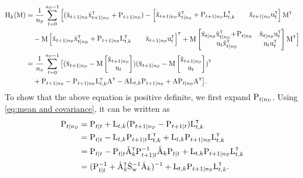 \begin{align}
    \mxH_k(\mxM) &= 
        \frac{1}{\nD} \sum_{t=0}^{\nD-1}  \Big[(\hat{\vcx}_{t+1|\nD}\hat{\vcx}_{t+1|\nD}^\tr + \mxP_{t+1|\nD}) -  \begin{bmatrix}\hat{\vcx}_{t+1|{\nD}}\hat{\vcx}_{t|{\nD}}^\tr + \mxP_{t+1|{\nD}}\mxL_{t,k}^\tr &\quad \hat{\vcx}_{t+1|\nD} \vcu_t^\tr  \end{bmatrix} {\mxM}^\tr  \nonumber \\
        &\quad -  {\mxM}\begin{bmatrix}\hat{\vcx}_{t+1|\nD}\hat{\vcx}_{t|\nD}^\tr + \mxP_{t+1|\nD}\mxL_{t,k}^\tr &\quad \hat{\vcx}_{t+1|\nD} \vcu_t^\tr  \end{bmatrix}^\tr + {\mxM} \begin{bmatrix}\hat{\vcx}_{t|\nD}\hat{\vcx}_{t|\nD}^\tr \!+\! \mxP_{t|\nD} & \hat{\vcx}_{t|\nD}\vcu_t^\tr\\ \vcu_t\hat{\vcx}_{t|\nD}^\tr &\vcu_t \vcu_t^\tr\end{bmatrix} {\mxM}^\tr \Big] \\
        &= \frac{1}{\nD} \sum_{t=0}^{\nD-1} 
        \big[ (\hat{\vcx}_{t+1|\nD} - 
        {\mxM}
        \begin{bmatrix}
            \hat{\vcx}_{t+1|\nD} \\ \vcu_t
        \end{bmatrix}
        )
        (\hat{\vcx}_{t+1|\nD} - 
        {\mxM}
        \begin{bmatrix}
            \hat{\vcx}_{t+1|\nD} \\ \vcu_t
        \end{bmatrix}
        )^\tr
        \nonumber \\
        &\quad + \mxP_{t+1|\nD} -  \mxP_{t+1|\nD}\mxL_{t,k}^\tr {\mxA}^\tr - {\mxA} \mxL_{t,k} \mxP_{t+1|\nD} + {\mxA}\mxP_{t|\nD}{\mxA}^\tr\big]. \label{eq:H_k 2}
\end{align}
To show that the above equation is positive definite, we first expand $\mxP_{t|\nD}$. Using \eqref{eq:mean and covariance}, it can be written as 
\begin{align}
    \mxP_{t|\nD} 
    &= \mxP_{t|t} + \mxL_{t,k}(\mxP_{t+1|\nD} - \mxP_{t+1|t})\mxL_{t,k}^\tr\\
    &= \mxP_{t|t} - \mxL_{t,k}\mxP_{t+1|t}\mxL_{t,k}^\tr + \mxL_{t,k}\mxP_{t+1|\nD}\mxL_{t,k}^\tr\\
    &= \mxP_{t|t} - \mxP_{t|t}\hat{\mxA}_k^\tr\mxP_{t+1|t}^{-1}\hat{\mxA}_k\mxP_{t|t} +\mxL_{t,k}\mxP_{t+1|\nD}\mxL_{t,k}^\tr\\
    &=(\mxP_{t|t}^{-1} + \hat{\mxA}_k^\tr \hat{\mxS}_{\vcw}^{-1} \hat{\mxA}_k)^{-1} + \mxL_{t,k}\mxP_{t+1|\nD}\mxL_{t,k}^\tr.\label{eq:P_t|nD}
\end{align}
